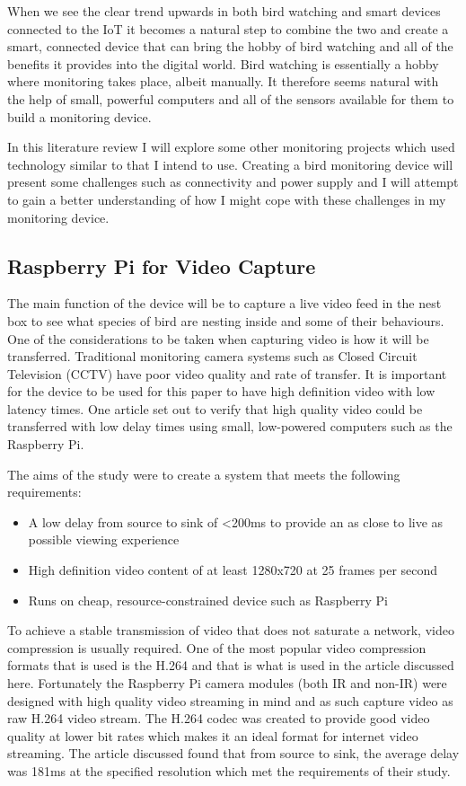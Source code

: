 \documentclass[10pt,a4paper]{article}
\begin{document}
When we see the clear trend upwards in both bird watching and smart devices connected to the IoT it becomes a natural step to combine the two and create a smart, connected device that can bring the hobby of bird watching and all of the benefits it provides into the digital world. Bird watching is essentially a hobby where monitoring takes place, albeit manually. It therefore seems natural with the help of small, powerful computers and all of the sensors available for them to build a monitoring device. 

In this literature review I will explore some other monitoring projects which used technology similar to that I intend to use. Creating a bird monitoring device will present some challenges such as connectivity and power supply and I will attempt to gain a better understanding of how I might cope with these challenges in my monitoring device.
\subsection{Raspberry Pi for Video Capture}
The main function of the device will be to capture a live video feed in the nest box to see what species of bird are nesting inside and some of their behaviours. One of the considerations to be taken when capturing video is how it will be transferred. Traditional monitoring camera systems such as Closed Circuit Television (CCTV) have poor video quality and rate of transfer. It is important for the device to be used for this paper to have high definition video with low latency times. One article\cite{Jennehag2016} set out to verify that high quality video could be transferred with low delay times using small, low-powered computers such as the Raspberry Pi. 

The aims of the study were to create a system that meets the following requirements:
\begin{itemize}
\item A low delay from source to sink of \textless200ms to provide an as close to live as possible viewing experience
\item High definition video content of at least 1280x720 at 25 frames per second
\item Runs on cheap, resource-constrained device such as Raspberry Pi
\end{itemize}

To achieve a stable transmission of video that does not saturate a network, video compression is usually required. One of the most popular video compression formats that is used is the H.264 and that is what is used in the article discussed here. Fortunately the Raspberry Pi camera modules (both IR and non-IR) were designed with high quality video streaming in mind and as such capture video as raw H.264 video stream\cite{piDoc}. The H.264 codec was created to provide good video quality at lower bit rates which makes it an ideal format for internet video streaming\cite{Wiegand2003}. The article discussed found that from source to sink, the average delay was 181ms at the specified resolution which met the requirements of their study.
\end{document}
